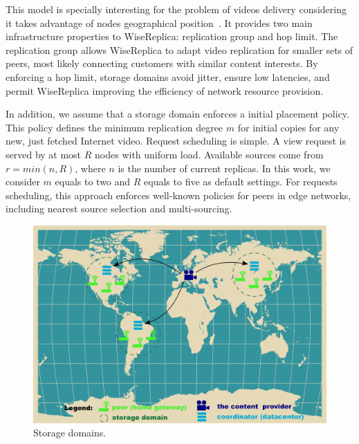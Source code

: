 This model is specially interesting for the problem of videos delivery considering it takes advantage of nodes geographical position~\cite{Brodersen_www_2012}. It provides two main infrastructure properties to WiseReplica: replication group and hop limit.  The replication group allows WiseReplica to adapt video replication for smaller sets of peers, most likely connecting customers with similar content interests. By enforcing a hop limit, storage domains avoid jitter, ensure low latencies, and permit WiseReplica improving  the efficiency of network resource provision. 

In addition, we assume that a storage domain enforces a initial placement policy. This policy defines the minimum replication degree $m$ for initial copies for any new, just fetched Internet video.  Request scheduling is simple. A view request is served by at most $R$ nodes with uniform load. Available sources come from $r=min(n,R)$, where $n$ is the number of current replicas. In this work, we consider $m$ equals to two and $R$ equals to five as default settings. For requests scheduling, this approach enforces well-known policies for peers in edge networks, including nearest source selection and multi-sourcing. 


\begin{figure}[htbp]
  \centering
  \begin{minipage}[t]{1\linewidth}
    \includegraphics[width=1\textwidth]{inputs/img/sd}
    \caption{Storage domains.}
    \label{fig:storage_domain}
  \end{minipage}
\end{figure}

